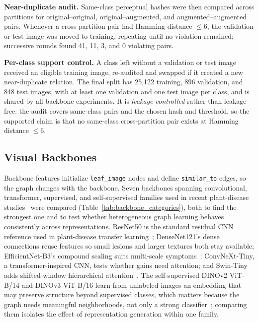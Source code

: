 \documentclass[conference]{IEEEtran}
\begin{document}
\textbf{Near-duplicate audit.} Same-class perceptual hashes were then compared across partitions for original--original, original--augmented, and augmented--augmented pairs. Whenever a cross-partition pair had Hamming distance $\le 6$, the validation or test image was moved to training, repeating until no violation remained; successive rounds found 41, 11, 3, and 0 violating pairs.

\textbf{Per-class support control.} A class left without a validation or test image received an eligible training image, re-audited and swapped if it created a new near-duplicate relation. The final split has 25,122 training, 896 validation, and 848 test images, with at least one validation and one test image per class, and is shared by all backbone experiments. It is \emph{leakage-controlled} rather than leakage-free: the audit covers same-class pairs and the chosen hash and threshold, so the supported claim is that no same-class cross-partition pair exists at Hamming distance $\le 6$.

\subsection{Visual Backbones}
\label{sec:backbone_selection}
Backbone features initialize \texttt{leaf\_image} nodes and define \texttt{similar\_to} edges, so the graph changes with the backbone. Seven backbones spanning convolutional, transformer, supervised, and self-supervised families used in recent plant-disease studies~\cite{thakur2023vitcnn,subburaj2025plantention,hasan2026multicrop} were compared (Table~\ref{tab:backbone_categories}), both to find the strongest one and to test whether heterogeneous graph learning behaves consistently across representations.
ResNet50 is the standard residual CNN reference used in plant-disease transfer learning~\cite{shahoveisi2023rust,shafik2024transfer}; DenseNet121's dense connections reuse features so small lesions and larger textures both stay available; EfficientNet-B3's compound scaling suits multi-scale symptoms~\cite{ali2025efficientnet}; ConvNeXt-Tiny, a transformer-inspired CNN, tests whether gains need attention; and Swin-Tiny adds shifted-window hierarchical attention~\cite{boukabouya2022vision,murugavalli2025plant,liu2025plant}. The self-supervised DINOv2 ViT-B/14 and DINOv3 ViT-B/16 learn from unlabeled images an embedding that may preserve structure beyond supervised classes, which matters because the graph needs meaningful neighborhoods, not only a strong classifier~\cite{wang2024ssl,zhao2023cla}; comparing them isolates the effect of representation generation within one family.
\end{document}
